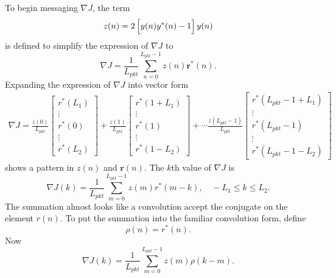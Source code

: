 To begin messaging $\nabla J$, the term
\begin{equation}
z(n) = 	2\left[ \vphantom{\displaystyle\sum}  y(n) y^\ast(n) - 1 \right] y(n)
\end{equation} 
is defined to simplify the expression of $\nabla J$ to
\begin{equation}
	\nabla J = \frac{1}{L_{pkt}} \sum_{n=0}^{L_{pkt}-1}
	z(n)  \mathbf{r}^\ast(n).
\label{eq:DelJcma-midMassage}
\end{equation}
Expanding the expression of $\nabla J$ into vector form
\begin{multline}
\nabla J
	= 
	\frac{z(0)}{L_{pkt}}
		\begin{bmatrix} r^\ast(L_1) \\ \vdots \\ r^\ast(0) \\ \vdots \\ r^\ast(L_2) \end{bmatrix} +
	\frac{z(1)}{L_{pkt}}
		\begin{bmatrix} r^\ast(1+L_1) \\ \vdots \\ r^\ast(1) \\ \vdots \\ r^\ast(1-L_2) \end{bmatrix} + \cdots
	\frac{z(L_{pkt}-1)}{L_{pkt}}
		\begin{bmatrix} r^\ast(L_{pkt}-1+L_1) \\ \vdots \\ r^\ast(L_{pkt}-1) \\ \vdots \\ r^\ast(L_{pkt}-1-L_2) \end{bmatrix}
\label{eq:delJ_writeoutr}
\end{multline}
shows a pattern in $z(n)$ and $\mathbf{r}(n)$.
The $k$th value of $\nabla J$ is
\begin{equation}
\nabla J(k) = \frac{1}{L_{pkt}} \sum^{L_{pkt}-1}_{m=0}  z(m) r^\ast(m-k), \quad -L_1 \leq k \leq L_2.
\label{eq:delJ_direct_way}
\end{equation}
The summation almost looks like a convolution accept the conjugate on the element $r(n)$.
To put the summation into the familiar convolution form, define
\begin{equation}
\rho(n) = r^\ast(n).
\end{equation}
Now
\begin{equation}
\nabla J(k) = \frac{1}{L_{pkt}} \sum^{L_{pkt}-1}_{m=0}  z(m) \rho(k-m).
\label{eq:CMA_delJ_rice_reformed}
\end{equation}

